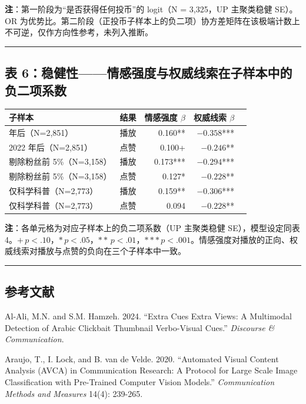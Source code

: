 \documentclass[
  fontset=none]{ctexart}
\begin{document}
\textbf{注}：第一阶段为``是否获得任何投币''的 logit（N = 3{,}325，UP 主聚类稳健 SE）。OR 为优势比。第二阶段（正投币子样本上的负二项）协方差矩阵在该极端计数上不可逆，仅作方向性参考，未列入推断。

\begin{center}\rule{0.5\linewidth}{0.5pt}\end{center}

\subsection{表 6：稳健性——情感强度与权威线索在子样本中的负二项系数}\label{ux8868-6}

\begin{longtable}[]{@{}llrrl@{}}
\toprule\noalign{}
子样本 & 结果 & 情感强度 \(\beta\) & 权威线索 \(\beta\) &  \\
\midrule\noalign{}
\endhead
\bottomrule\noalign{}
\endlastfoot
2022 年后（N=2,851） & 播放 & 0.160** & \(-0.358\)*** &  \\
2022 年后（N=2,851） & 点赞 & 0.100+ & \(-0.246\)** &  \\
剔除粉丝前 5\%（N=3,158） & 播放 & 0.173*** & \(-0.294\)*** &  \\
剔除粉丝前 5\%（N=3,158） & 点赞 & 0.127* & \(-0.228\)** &  \\
仅科学科普（N=2,773） & 播放 & 0.159** & \(-0.306\)*** &  \\
仅科学科普（N=2,773） & 点赞 & 0.094 & \(-0.228\)** &  \\
\end{longtable}

\textbf{注}：各单元格为对应子样本上的负二项系数（UP 主聚类稳健 SE），模型设定同表 4。\(+\,p<.10\)，\(*\,p<.05\)，\(**\,p<.01\)，\(***\,p<.001\)。情感强度对播放的正向、权威线索对播放与点赞的负向在三个子样本中一致。

\begin{center}\rule{0.5\linewidth}{0.5pt}\end{center}

\subsection{参考文献}\label{ux53c2ux8003ux6587ux732e}

Al-Ali, M.N. and S.M. Hamzeh. 2024. ``Extra Cues Extra Views: A Multimodal Detection of Arabic Clickbait Thumbnail Verbo-Visual Cues.'' \emph{Discourse \& Communication}.


Araujo, T., I. Lock, and B. van de Velde. 2020. ``Automated Visual Content Analysis (AVCA) in Communication Research: A Protocol for Large Scale Image Classification with Pre-Trained Computer Vision Models.'' \emph{Communication Methods and Measures} 14(4): 239-265.
\end{document}
